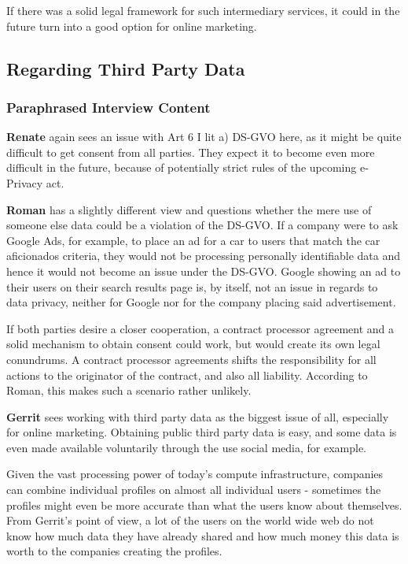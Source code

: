 If there was a solid legal framework for such intermediary services, it could in the future turn into a good option for online marketing.

\subsection{Regarding Third Party Data}

\subsubsection{Paraphrased Interview Content}

\textbf{Renate} again sees an issue with Art 6 I lit a) DS-GVO here, as it might be quite difficult to get consent from all parties. They expect it to become even more difficult in the future, because of potentially strict rules of the upcoming e-Privacy act.

\textbf{Roman} has a slightly different view and questions whether the mere use of someone else data could be a violation of the DS-GVO. If a company were to ask Google Ads, for example, to place an ad for a car to users that match the car aficionados criteria, they would not be processing personally identifiable data and hence it would not become an issue under the DS-GVO. Google showing an ad to their users on their search results page is, by itself, not an issue in regards to data privacy, neither for Google nor for the company placing said advertisement.

If both parties desire a closer cooperation, a contract processor agreement and a solid mechanism to obtain consent could work, but would create its own legal conundrums. A contract processor agreements shifts the responsibility for all actions to the originator of the contract, and also all liability. According to Roman, this makes such a scenario rather unlikely.

\textbf{Gerrit} sees working with third party data as the biggest issue of all, especially for online marketing. Obtaining public third party data is easy, and some data is even made available voluntarily through the use social media, for example.

Given the vast processing power of today's compute infrastructure, companies can combine individual profiles on almost all individual users - sometimes the profiles might even be more accurate than what the users know about themselves. From Gerrit's point of view, a lot of the users on the world wide web do not know how much data they have already shared and how much money this data is worth to the companies creating the profiles.

